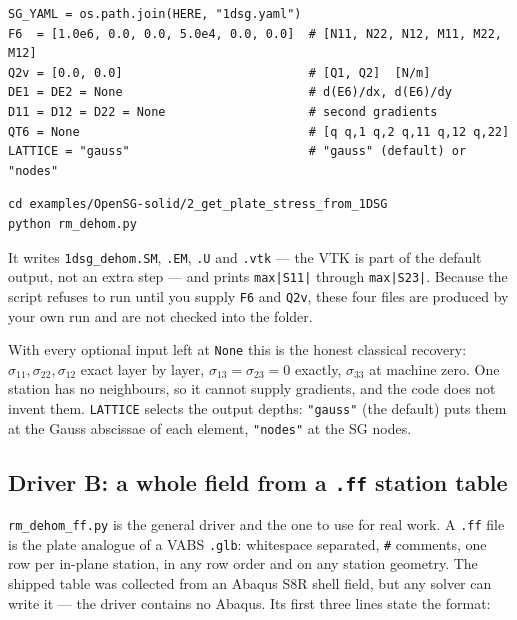 \begin{lstlisting}[style=opensg,caption={The USER INPUT block of rm\_dehom.py, with the two mandatory entries supplied.}]
SG_YAML = os.path.join(HERE, "1dsg.yaml")
F6  = [1.0e6, 0.0, 0.0, 5.0e4, 0.0, 0.0]  # [N11, N22, N12, M11, M22, M12]
Q2v = [0.0, 0.0]                          # [Q1, Q2]  [N/m]
DE1 = DE2 = None                          # d(E6)/dx, d(E6)/dy
D11 = D12 = D22 = None                    # second gradients
QT6 = None                                # [q q,1 q,2 q,11 q,12 q,22]
LATTICE = "gauss"                         # "gauss" (default) or "nodes"
\end{lstlisting}

\begin{lstlisting}[style=shellst]
cd examples/OpenSG-solid/2_get_plate_stress_from_1DSG
python rm_dehom.py
\end{lstlisting}

It writes \texttt{1dsg\_dehom.SM}, \texttt{.EM}, \texttt{.U} and \texttt{.vtk}
--- the VTK is part of the default output, not an extra step --- and prints
\texttt{max|S11|} through \texttt{max|S23|}. Because the script refuses to run
until you supply \texttt{F6} and \texttt{Q2v}, these four files are produced by
your own run and are not checked into the folder.

With every optional input left at \texttt{None} this is the honest classical
recovery: $\sigma_{11}, \sigma_{22}, \sigma_{12}$ exact layer by layer,
$\sigma_{13} = \sigma_{23} = 0$ exactly, $\sigma_{33}$ at machine zero. One
station has no neighbours, so it cannot supply gradients, and the code does not
invent them. \texttt{LATTICE} selects the output depths: \texttt{"gauss"} (the
default) puts them at the Gauss abscissae of each element, \texttt{"nodes"} at
the SG nodes.

\subsection{Driver B: a whole field from a \texttt{.ff} station table}

\texttt{rm\_dehom\_ff.py} is the general driver and the one to use for real
work. A \texttt{.ff} file is the plate analogue of a VABS \texttt{.glb}:
whitespace separated, \texttt{\#} comments, one row per in-plane station, in any
row order and on any station geometry. The shipped table was collected from an
Abaqus S8R shell field, but any solver can write it --- the driver contains no
Abaqus. Its first three lines state the format:

